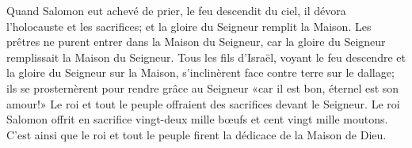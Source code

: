 Quand Salomon eut achevé de prier,
	le feu descendit du ciel, il dévora l’holocauste et les sacrifices;
	et la gloire du Seigneur remplit la Maison.
Les prêtres ne purent entrer dans la Maison du Seigneur,
	car la gloire du Seigneur remplissait la Maison du Seigneur.
Tous les fils d’Israël, voyant le feu descendre et la gloire du Seigneur sur la Maison,
	s’inclinèrent face contre terre sur le dallage;
	ils se prosternèrent pour rendre grâce au Seigneur
		«car il est bon, éternel est son amour!»
Le roi et tout le peuple offraient des sacrifices devant le Seigneur.
	Le roi Salomon offrit en sacrifice vingt-deux mille bœufs
		et cent vingt mille moutons.
C’est ainsi que le roi et tout le peuple firent la dédicace de la Maison de Dieu.
